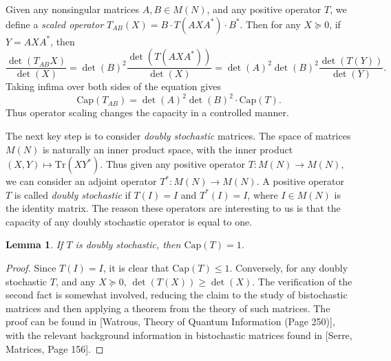 \documentclass[12pt]{article}
\newtheorem{lemma}[theorem]{Lemma}
\begin{document}
Given any nonsingular matrices $A,B \in M(N)$, and any positive operator $T$, we define a \emph{scaled operator} $T_{AB}(X) = B \cdot T(AXA^*) \cdot B^*$. Then for any $X \succeq 0$, if $Y = AXA^*$, then
%
\[ \frac{\det(T_{AB}X)}{\det(X)} = \det(B)^2 \frac{\det(T(AXA^*))}{\det(X)} = \det(A)^2 \det(B)^2 \frac{\det(T(Y))}{\det(Y)}. \]
%
Taking infima over both sides of the equation gives
%
\[ \text{Cap}(T_{AB}) = \det(A)^2 \det(B)^2 \cdot \text{Cap}(T). \]
%
Thus operator scaling changes the capacity in a controlled manner.

The next key step is to consider \emph{doubly stochastic} matrices. The space of matrices $M(N)$ is naturally an inner product space, with the inner product $(X,Y) \mapsto \text{Tr}(XY^*)$. Thus given any positive operator $T: M(N) \to M(N)$, we can consider an adjoint operator $T^*: M(N) \to M(N)$. A positive operator $T$ is called \emph{doubly stochastic} if $T(I) = I$ and $T^*(I) = I$, where $I \in M(N)$ is the identity matrix. The reason these operators are interesting to us is that the capacity of any doubly stochastic operator is equal to one.

\begin{lemma} \label{doublystochasticcapacitytheorem}
    If $T$ is doubly stochastic, then $\text{Cap}(T) = 1$.
\end{lemma}
\begin{proof}
    Since $T(I) = I$, it is clear that $\text{Cap}(T) \leq 1$. Conversely, for any doubly stochastic $T$, and any $X \succeq 0$, $\det(T(X)) \geq \det(X)$. The verification of the second fact is somewhat involved, reducing the claim to the study of bistochastic matrices and then applying a theorem from the theory of such matrices. The proof can be found in [Watrous, Theory of Quantum Information (Page 250)], with the relevant background information in bistochastic matrices found in [Serre, Matrices, Page 156].
\end{proof}
\end{document}

